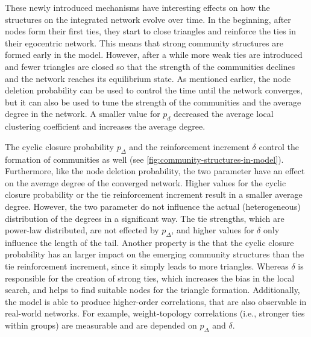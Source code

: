 These newly introduced mechanisms have interesting effects on how the structures on the integrated network evolve over time.
In the beginning, after nodes form their first ties, they start to close triangles and reinforce the ties in their egocentric network.
This means that strong community structures are formed early in the model.
However, after a while more weak ties are introduced and fewer triangles are closed so that the strength of the communities declines and the network reaches its equilibrium state.
As mentioned earlier, the node deletion probability can be used to control the time until the network converges, but it can also be used to tune the strength of the communities and the average degree in the network.
A smaller value for \( p_{d} \) decreased the average local clustering coefficient and increases the average degree.

The cyclic closure probability \( p_{\Delta} \) and the reinforcement increment \( \delta \) control the formation of communities as well (see \autoref{fig:community-structures-in-model}).
Furthermore, like the node deletion probability, the two parameter have an effect on the average degree of the converged network.
Higher values for the cyclic closure probability or the tie reinforcement increment result in a smaller average degree.
However, the two parameter do not influence the actual (heterogeneous) distribution of the degrees in a significant way.
The tie strengths, which are power-law distributed, are not effected by \( p_{\Delta} \), and higher values for \( \delta \) only influence the length of the tail.
Another property is the that the cyclic closure probability has an larger impact on the emerging community structures than the tie reinforcement increment, since it simply leads to more triangles.
Whereas \( \delta \) is responsible for the creation of strong ties, which increases the bias in the local search, and helps to find suitable nodes for the triangle formation.
Additionally, the model is able to produce higher-order correlations, that are also observable in real-world networks.
For example, weight-topology correlations (i.e., stronger ties within groups) are measurable and are depended on \( p_{\Delta} \) and \( \delta \).


